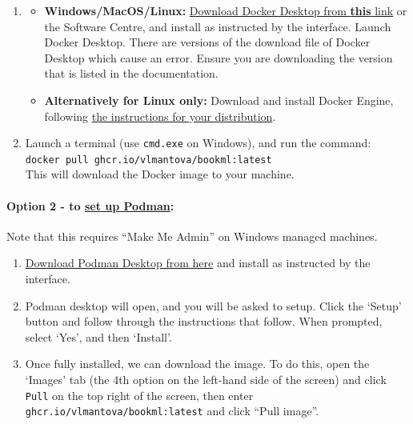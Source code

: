 \begin{enumerate}
    \item
        \begin{itemize}
            \item \textbf{Windows/MacOS/Linux:} \href{https://docs.docker.com/desktop/install/windows-install/}{Download Docker Desktop from \textbf{this} link} or the Software Centre, and install as instructed by the interface. Launch Docker Desktop. 
There are versions of the download file of Docker Desktop which cause an error. Ensure you are downloading the version that is listed in the documentation.
            \item \textbf{Alternatively for Linux only:} Download and install Docker Engine, following \href{https://docs.docker.com/engine/install/}{the instructions for your distribution}.
        \end{itemize}
    \item Launch a terminal (use \verb|cmd.exe| on Windows), and run the command:\\
        \verb|docker pull ghcr.io/vlmantova/bookml:latest|\\
        This will download the Docker image to your machine.
\end{enumerate}

\paragraph{Option 2 - to \href{https://podman.io/docs/installation}{set up Podman}:}

Note that this requires ``Make Me Admin'' on Windows managed machines.

\begin{enumerate}
    \item \href{https://podman.io/}{Download Podman Desktop from here} and install as instructed by the interface. 
    \item Podman desktop will open, and you will be asked to setup.
    Click the `Setup' button and follow through the instructions 
    that follow. When prompted, select `Yes', and then `Install'. 
    \item Once fully installed, we can download the image. To do this, open the `Images' tab
        (the 4th option on the left-hand side of the screen) and click \verb|Pull| on the top right of the screen, then enter \verb|ghcr.io/vlmantova/bookml:latest| and click ``Pull image''. 
\end{enumerate}

